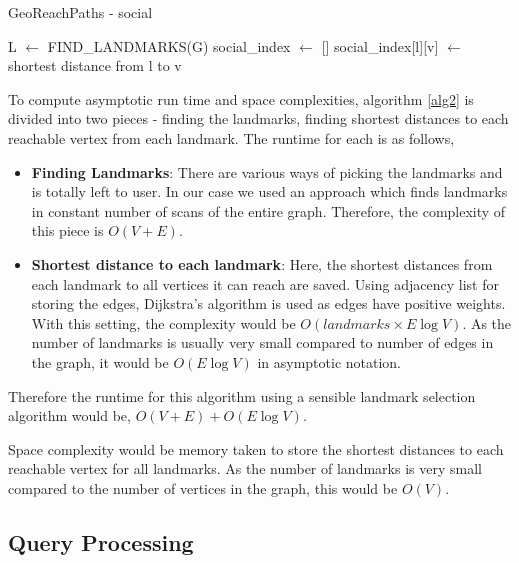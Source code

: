 \begin{algorithm}[t]
\caption{GeoReachPaths - social}
\begin{scriptsize}
\label{alg2}
\begin{algorithmic}[1]

  \State L $\gets$ FIND\_LANDMARKS(G) 
  \State social\_index $\gets$ []
	  	\State social\_index[l][v] $\gets $ shortest distance from l to v
	\EndFor
  \EndFor
\EndFunction
\end{algorithmic}

\end{scriptsize}
\end{algorithm}

To compute asymptotic run time and space complexities, algorithm \ref{alg2} is divided into two pieces - finding the landmarks, finding shortest distances to each reachable vertex from each landmark. The runtime for each is as follows,
\begin{itemize}
	\item \textbf{Finding Landmarks}: There are various ways of picking the landmarks and is totally left to user. In our case we used an approach which finds landmarks in constant number of scans of the entire graph. Therefore, the complexity of this piece is $O(V + E)$.

	\item \textbf{Shortest distance to each landmark}: Here, the shortest distances from each landmark to all vertices it can reach are saved. Using adjacency list for storing the edges, Dijkstra's algorithm is used as edges have positive weights. With this setting, the complexity would be $O(landmarks \times E\log V)$. As the number of landmarks is usually very small compared to number of edges in the graph, it would be $O(E\log V)$ in asymptotic notation.
\end{itemize}

Therefore the runtime for this algorithm using a sensible landmark selection algorithm would be, $O(V + E) + O(E\log V)$.

Space complexity would be memory taken to store the shortest distances to each reachable vertex for all landmarks. As the number of landmarks is very small compared to the number of vertices in the graph, this would be $O(V)$.

\subsection{Query Processing} \label{querying}

